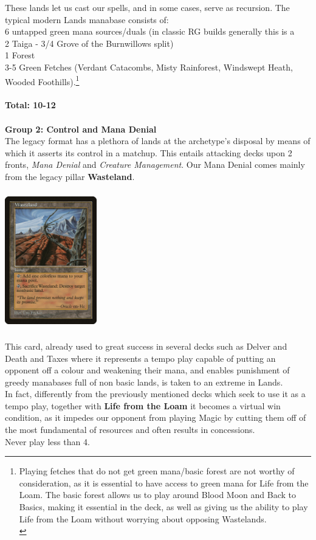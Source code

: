 \documentclass{report}
\begin{document}
These lands let us cast our spells, and in some cases, serve as recursion.
The typical modern Lands manabase consists of:\\
6 untapped green mana sources/duals (in classic RG builds generally this is a \\2 Taiga - 3/4 Grove of the Burnwillows split)\\
1 Forest\\
3-5 Green Fetches (Verdant Catacombs, Misty Rainforest, Windswept Heath, Wooded Foothills).\footnote{Playing fetches that do not get green mana/basic forest are not worthy of consideration, as it is essential to have access to green mana for Life from the Loam. The basic forest allows us to play around Blood Moon and Back to Basics, making it essential in the deck, as well as giving us the ability to play Life from the Loam without worrying about opposing Wastelands.\\}
\\\\\textbf{Total: 10-12}\\\\
\textbf{Group 2: Control and Mana Denial}\\
The legacy format has a plethora of lands at the archetype's disposal by means of which it asserts its control in a matchup. This entails attacking decks upon 2 fronts, \emph{Mana Denial} and \emph{Creature Management}.
Our Mana Denial comes mainly from the legacy pillar \textbf{Wasteland}.
\begin{center}
\includegraphics [width = 4cm, height = 6cm] {wasteland}
\end{center}
This card, already used to great success in several decks such as Delver and Death and Taxes where it represents a tempo play capable of putting an opponent off a colour and weakening their mana, and enables punishment of greedy manabases full of non basic lands, is taken to an extreme in Lands.\\In fact, differently from the previously mentioned decks which seek to use it as a tempo play, together with \textbf{Life from the Loam} it becomes a virtual win condition, as it impedes our opponent from playing Magic by cutting them off of the most fundamental of resources and often results in concessions.\\Never play less than 4.\\
\end{document}
